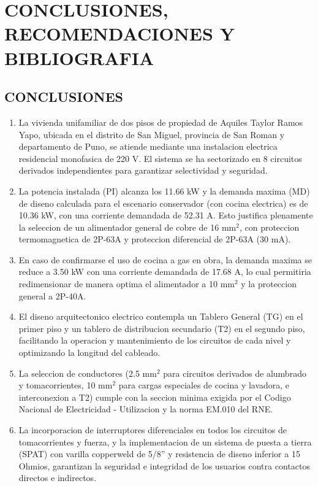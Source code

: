 \chapter*{CONCLUSIONES, RECOMENDACIONES Y BIBLIOGRAFIA}

\setcounter{section}{0}
\renewcommand{\thesection}{8.\arabic{section}.}
\renewcommand{\thesubsection}{8.\arabic{section}.\arabic{subsection}.}
\renewcommand{\theHsection}{anexos.\arabic{section}}
\renewcommand{\theHsubsection}{anexos.\arabic{section}.\arabic{subsection}}

\section{CONCLUSIONES}

\begin{enumerate}
  \item La vivienda unifamiliar de dos pisos de propiedad de Aquiles Taylor Ramos Yapo, ubicada en el distrito de San Miguel, provincia de San Roman y departamento de Puno, se atiende mediante una instalacion electrica residencial monofasica de 220 V. El sistema se ha sectorizado en 8 circuitos derivados independientes para garantizar selectividad y seguridad.
  \item La potencia instalada (PI) alcanza los 11.66 kW y la demanda maxima (MD) de diseno calculada para el escenario conservador (con cocina electrica) es de 10.36 kW, con una corriente demandada de 52.31 A. Esto justifica plenamente la seleccion de un alimentador general de cobre de 16 mm\(^2\), con proteccion termomagnetica de 2P-63A y proteccion diferencial de 2P-63A (30 mA).
  \item En caso de confirmarse el uso de cocina a gas en obra, la demanda maxima se reduce a 3.50 kW con una corriente demandada de 17.68 A, lo cual permitiria redimensionar de manera optima el alimentador a 10 mm\(^2\) y la proteccion general a 2P-40A.
  \item El diseno arquitectonico electrico contempla un Tablero General (TG) en el primer piso y un tablero de distribucion secundario (T2) en el segundo piso, facilitando la operacion y mantenimiento de los circuitos de cada nivel y optimizando la longitud del cableado.
  \item La seleccion de conductores (2.5 mm\(^2\) para circuitos derivados de alumbrado y tomacorrientes, 10 mm\(^2\) para cargas especiales de cocina y lavadora, e interconexion a T2) cumple con la seccion minima exigida por el Codigo Nacional de Electricidad - Utilizacion y la norma EM.010 del RNE.
  \item La incorporacion de interruptores diferenciales en todos los circuitos de tomacorrientes y fuerza, y la implementacion de un sistema de puesta a tierra (SPAT) con varilla copperweld de 5/8'' y resistencia de diseno inferior a 15 Ohmios, garantizan la seguridad e integridad de los usuarios contra contactos directos e indirectos.
\end{enumerate}

